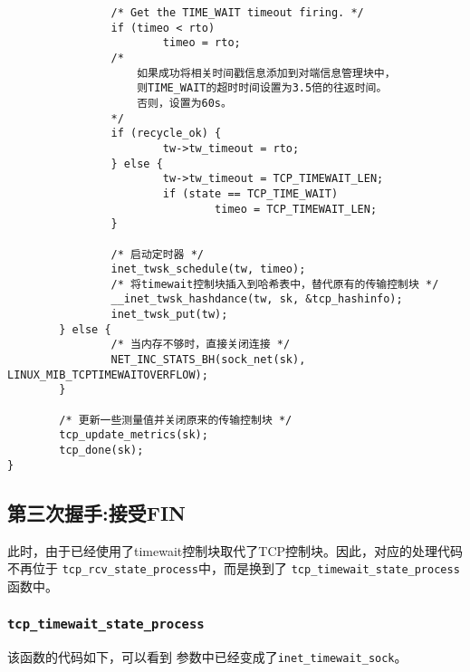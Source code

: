\begin{verbatim}
                /* Get the TIME_WAIT timeout firing. */
                if (timeo < rto)
                        timeo = rto;
				/*
					如果成功将相关时间戳信息添加到对端信息管理块中，
					则TIME_WAIT的超时时间设置为3.5倍的往返时间。
					否则，设置为60s。
				*/
                if (recycle_ok) {
                        tw->tw_timeout = rto;
                } else {
                        tw->tw_timeout = TCP_TIMEWAIT_LEN;
                        if (state == TCP_TIME_WAIT)
                                timeo = TCP_TIMEWAIT_LEN;
                }

                /* 启动定时器 */
                inet_twsk_schedule(tw, timeo);
                /* 将timewait控制块插入到哈希表中，替代原有的传输控制块 */
                __inet_twsk_hashdance(tw, sk, &tcp_hashinfo);
                inet_twsk_put(tw);
        } else {
                /* 当内存不够时，直接关闭连接 */
                NET_INC_STATS_BH(sock_net(sk), LINUX_MIB_TCPTIMEWAITOVERFLOW);
        }

        /* 更新一些测量值并关闭原来的传输控制块 */
        tcp_update_metrics(sk);
        tcp_done(sk);
}
\end{verbatim}

	\subsection{第三次握手:接受FIN}
		\label{subsec:third_recv_fin}
			此时，由于已经使用了timewait控制块取代了TCP控制块。因此，对应的处理代码不再位于
			\texttt{tcp_rcv_state_process}中，而是换到了
			\texttt{tcp_timewait_state_process}函数中。
		\subsubsection{\texttt{tcp_timewait_state_process}}
			\label{ClientReceiveFIN:tcp_timewait_state_process}
			该函数的代码如下，可以看到
			参数中已经变成了\texttt{inet_timewait_sock}。

